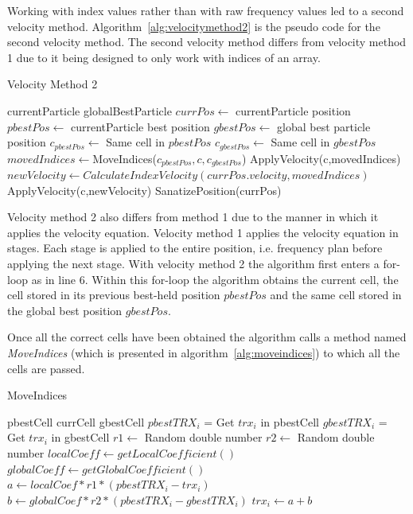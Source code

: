 Working with index values rather than with raw frequency values led to  a second velocity method. Algorithm~\ref{alg:velocitymethod2} is the pseudo code for the second velocity method. The second velocity method differs from velocity method 1 due to it being designed to only work with indices of an array.
\begin{algorithm}[H]
\caption{Velocity Method 2}
\label{alg:velocitymethod2}
\begin{algorithmic}[1]
	\Require currentParticle
	\Require globalBestParticle
	\State $currPos \leftarrow$ currentParticle position
	\State $pbestPos \leftarrow$ currentParticle best position
	\State $gbestPos \leftarrow$ global best particle position
		\State $c_{pbestPos} \leftarrow $ Same cell in $pbestPos$
		\State $c_{gbestPos} \leftarrow $ Same cell in $gbestPos$
		\State $movedIndices \leftarrow $MoveIndices($c_{pbestPos},c,c_{gbestPos}$)
			\State ApplyVelocity(c,movedIndices)
		\Else
			\State $newVelocity \leftarrow CalculateIndexVelocity(currPos.velocity,movedIndices)$
			\State ApplyVelocity(c,newVelocity)
		\EndIf
	\EndFor
	\State SanatizePosition(currPos)
\end{algorithmic}
\end{algorithm}

Velocity method 2 also differs from method 1 due to the manner in which it applies the velocity equation. Velocity method 1 applies the velocity equation in stages. Each stage is applied to the entire position, i.e. frequency plan before applying the next stage. With velocity method 2 the algorithm first enters a for-loop as in line 6. Within this for-loop the algorithm obtains the current cell, the cell stored in its previous best-held position $pbestPos$ and the same cell stored in the global best position $gbestPos$.

Once all the correct cells have been obtained the algorithm calls a method named \emph{MoveIndices} (which is presented in algorithm~\ref{alg:moveindices}) to which all the cells are passed.
\begin{algorithm}
\caption {MoveIndices}
\label{alg:moveindices}
\begin{algorithmic}[1]
	\Require pbestCell
	\Require currCell
	\Require gbestCell
		\State $pbestTRX_i$ = Get $trx_i$ in pbestCell
		\State $gbestTRX_i$ = Get $trx_i$ in gbestCell
		\State $r1 \leftarrow$ Random double number
		\State $r2 \leftarrow$ Random double number
		\State $localCoeff \leftarrow getLocalCoefficient()$
		\State $globalCoeff \leftarrow getGlobalCoefficient()$
		\State $a \leftarrow localCoef * r1 * (pbestTRX_i - trx_i)$
		\State $b \leftarrow globalCoef * r2 * (pbestTRX_i - gbestTRX_i)$
		\State $trx_i \leftarrow a + b$
	\EndFor
\end{algorithmic}
\end{algorithm}


